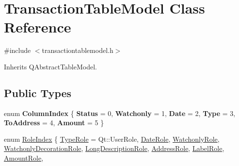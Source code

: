 \hypertarget{class_transaction_table_model}{}\section{Transaction\+Table\+Model Class Reference}
\label{class_transaction_table_model}


{\ttfamily \#include $<$transactiontablemodel.\+h$>$}



Inherits Q\+Abstract\+Table\+Model.

\subsection*{Public Types}
\begin{DoxyCompactItemize}
\item 
\mbox{\label{class_transaction_table_model_aca9d1efb507b6e471b31dc8c73c5bb43}} 
enum {\bfseries Column\+Index} \{ \newline
{\bfseries Status} = 0, 
{\bfseries Watchonly} = 1, 
{\bfseries Date} = 2, 
{\bfseries Type} = 3, 
\newline
{\bfseries To\+Address} = 4, 
{\bfseries Amount} = 5
 \}
\item 
enum \mbox{\hyperlink{class_transaction_table_model_a4b248508c36df598476affbf9871d1e6}{Role\+Index}} \{ \newline
\mbox{\hyperlink{class_transaction_table_model_a4b248508c36df598476affbf9871d1e6a35c49f8c0732954b2812c67e4c745840}{Type\+Role}} = Qt\+::User\+Role, 
\mbox{\hyperlink{class_transaction_table_model_a4b248508c36df598476affbf9871d1e6a46e879bd509162d980df3692c65eb66e}{Date\+Role}}, 
\mbox{\hyperlink{class_transaction_table_model_a4b248508c36df598476affbf9871d1e6ac9d6c430f98f849e491b36dc316fe1f4}{Watchonly\+Role}}, 
\mbox{\hyperlink{class_transaction_table_model_a4b248508c36df598476affbf9871d1e6ab8c8d02e47656a5086bafcb7c21847db}{Watchonly\+Decoration\+Role}}, 
\newline
\mbox{\hyperlink{class_transaction_table_model_a4b248508c36df598476affbf9871d1e6a2957b8435634d7602e74b513d392d82c}{Long\+Description\+Role}}, 
\mbox{\hyperlink{class_transaction_table_model_a4b248508c36df598476affbf9871d1e6ab82599f86b9cf8d0907e42bc8158ef16}{Address\+Role}}, 
\mbox{\hyperlink{class_transaction_table_model_a4b248508c36df598476affbf9871d1e6a286d79e8b1e0bfc8cb6bb72bbec78de2}{Label\+Role}}, 
\mbox{\hyperlink{class_transaction_table_model_a4b248508c36df598476affbf9871d1e6ace07f7f11257526cef9d6613c23cfff4}{Amount\+Role}}, 

\end{DoxyCompactItemize}
